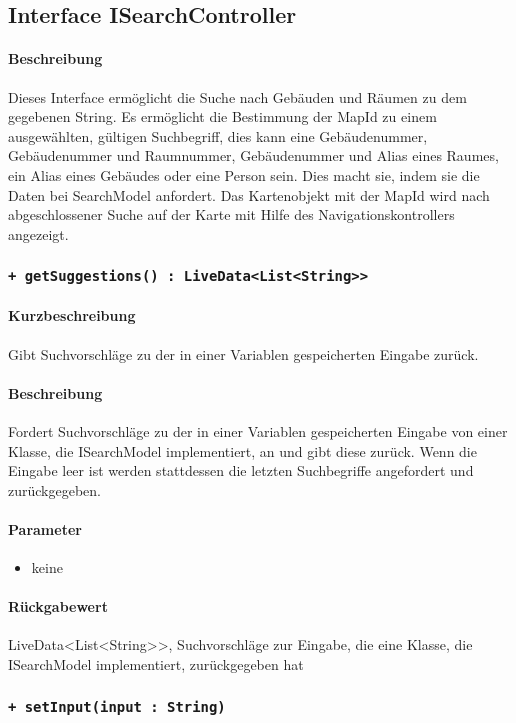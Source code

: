 \subsection{Interface ISearchController}
\paragraph*{Beschreibung}
Dieses Interface ermöglicht die Suche nach Gebäuden und Räumen zu dem gegebenen String. 
Es ermöglicht die Bestimmung der MapId zu einem ausgewählten, gültigen Suchbegriff, 
dies kann eine Gebäudenummer, Gebäudenummer und Raumnummer, Gebäudenummer und Alias eines Raumes, ein Alias eines Gebäudes oder eine Person sein.
Dies macht sie, indem sie die Daten bei SearchModel anfordert.
Das Kartenobjekt mit der MapId wird nach abgeschlossener Suche auf der Karte mit Hilfe des Navigationskontrollers angezeigt.


\subsubsection{\texttt{+ getSuggestions() : LiveData<List<String>>}}%
\paragraph*{Kurzbeschreibung}
Gibt Suchvorschläge zu der in einer Variablen gespeicherten Eingabe zurück.
\paragraph*{Beschreibung}
Fordert Suchvorschläge zu der in einer Variablen gespeicherten Eingabe von einer Klasse, die ISearchModel implementiert, an und gibt diese zurück.
Wenn die Eingabe leer ist werden stattdessen die letzten Suchbegriffe angefordert und zurückgegeben.
\paragraph*{Parameter}
\begin{itemize}
    \item keine
\end{itemize}
\paragraph*{Rückgabewert}
LiveData<List<String>>, Suchvorschläge zur Eingabe, die eine Klasse, die ISearchModel implementiert, zurückgegeben hat

\subsubsection{\texttt{+ setInput(input : String)}}%
